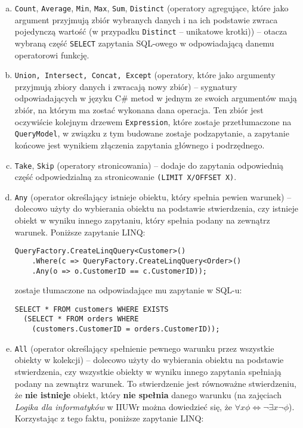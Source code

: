 \begin{enumerate}[a)]
\item \texttt{Count}, \texttt{Average}, \texttt{Min}, \texttt{Max}, \texttt{Sum}, \texttt{Distinct} (operatory agregujące, które jako argument przyjmują zbiór wybranych danych i na ich podstawie zwraca pojedynczą wartość (w przypadku \texttt{Distinct} – unikatowe krotki)) – otacza wybraną część \texttt{SELECT} zapytania SQL-owego w odpowiadającą danemu operatorowi funkcję.
\item \texttt{Union, Intersect, Concat, Except} (operatory, które jako argumenty przyjmują zbiory danych i zwracają nowy zbiór) – sygnatury odpowiadających w języku C\# metod w jednym ze swoich argumentów mają zbiór, na którym ma zostać wykonana dana operacja. Ten zbiór jest oczywiście kolejnym drzewem \texttt{Expression}, które zostaje przetłumaczone na \texttt{QueryModel}, w związku z tym budowane zostaje podzapytanie, a zapytanie końcowe jest wynikiem złączenia zapytania głównego i podrzędnego. 
\item \texttt{Take}, \texttt{Skip} (operatory stronicowania) – dodaje do zapytania odpowiednią część odpowiedzialną za stronicowanie \texttt{(LIMIT X/OFFSET X)}.
\item \texttt{Any} (operator określający istnieje obiektu, który spełnia pewien warunek) – dolecowo użyty do wybierania obiektu na podstawie stwierdzenia, czy istnieje obiekt w wyniku innego zapytaniu, który spełnia podany na zewnątrz warunek. Poniższe zapytanie LINQ:

\begin{lstlisting}
QueryFactory.CreateLinqQuery<Customer>()
    .Where(c => QueryFactory.CreateLinqQuery<Order>()
    .Any(o => o.CustomerID == c.CustomerID));
\end{lstlisting}

zostaje tłumaczone na odpowiadające mu zapytanie w SQL-u:

\begin{lstlisting}
SELECT * FROM customers WHERE EXISTS 
  (SELECT * FROM orders WHERE
    (customers.CustomerID = orders.CustomerID));
\end{lstlisting}

\item \texttt{All} (operator określający spełnienie pewnego warunku przez wszystkie obiekty w kolekcji) – dolecowo użyty do wybierania obiektu na podstawie stwierdzenia, czy wszystkie obiekty w wyniku innego zapytania spełniają podany na zewnątrz warunek. To stwierdzenie jest równoważne stwierdzeniu, że \textbf{nie istnieje} obiekt, który \textbf{nie spełnia} danego warunku (na zajęciach \textit{Logika dla informatyków} w IIUWr można dowiedzieć się, że $\forall x \phi \Leftrightarrow \neg \exists x \neg \phi$). Korzystając z tego faktu, poniższe zapytanie LINQ:


\end{enumerate}

